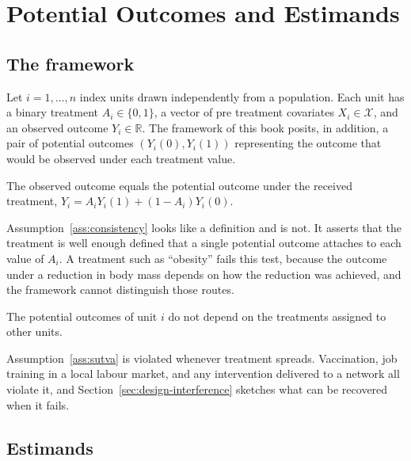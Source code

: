 \chapter{Potential Outcomes and Estimands}
\label{chap:potential-outcomes}

\section{The framework}
\label{sec:po-framework}

Let $i = 1, \dots, n$ index units drawn independently from a population. Each
unit has a binary treatment $A_i \in \{0,1\}$, a vector of pre treatment
covariates $X_i \in \mathcal{X}$, and an observed outcome $Y_i \in \mathbb{R}$.
The framework of this book posits, in addition, a pair of potential
outcomes $\left( Y_i(0), Y_i(1) \right)$ representing
the outcome that would be observed under each treatment value.

\begin{assumption}[Consistency]
\label{ass:consistency}
The observed outcome equals the potential outcome under the received treatment,
$Y_i = A_i Y_i(1) + (1 - A_i) Y_i(0)$.
\end{assumption}

Assumption~\ref{ass:consistency} looks like a definition and is not. It asserts
that the treatment is well enough defined that a single potential outcome
attaches to each value of $A_i$. A treatment such as ``obesity'' fails this
test, because the outcome under a reduction in body mass depends on how the
reduction was achieved, and the framework cannot distinguish those routes.

\begin{assumption}[No interference]
\label{ass:sutva}
The potential outcomes of unit $i$ do not depend on the treatments assigned to
other units.
\end{assumption}

Assumption~\ref{ass:sutva} is violated whenever treatment spreads. Vaccination,
job training in a local labour market, and any intervention delivered to a
network all violate it, and Section~\ref{sec:design-interference} sketches what
can be recovered when it fails.

\section{Estimands}
\label{sec:po-estimands}

